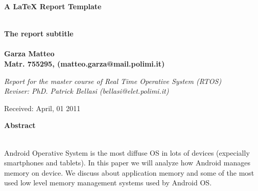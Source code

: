 \documentclass[a4paper,10pt]{article}
\newenvironment*{mytitle}{\begin{LARGE}\bf}{\end{LARGE}\\}%
\newenvironment*{mysubtitle}{\bf}{\\[1.5ex]}%
\newenvironment*{myabstract}{\begin{Large}\bf}{\end{Large}\\[2.5ex]}%
\begin{document}
\begin{mytitle}A LaTeX Report Template\end{mytitle}
\begin{mysubtitle}The report subtitle\end{mysubtitle}
%
%
\\
Garza Matteo\\
Matr. 755295, (matteo.garza@mail.polimi.it)\\
\hspace{10ex}
\begin{flushright}
\emph{Report for the master course of Real Time Operative System (RTOS)}\\
\emph{Reviser: PhD. Patrick Bellasi (bellasi@elet.polimi.it)}
\end{flushright}

Received: April, 01 2011\\
\hspace{10ex}

\begin{myabstract} Abstract \end{myabstract}
Android Operative System is the most diffuse OS in lots of devices (expecially smartphones and tablets).
In this paper we will analyze how Android manages memory on device. We discuss about application memory and
some of the most used low level memory management systems used by Android OS.
\end{document}
